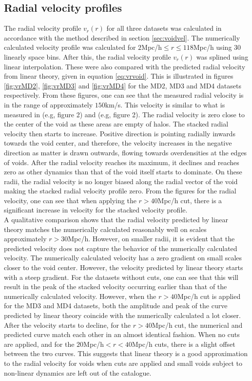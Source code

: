 \subsection{Radial velocity profiles}
The radial velocity profile $v_r(r)$ for all three datasets was calculated in accordance with the method described in section \ref{sec:voidvel}. The numerically calculated velocity profile was calculated for $2$Mpc/h$\leq r\leq 118$Mpc/h using $30$ linearly space bins. After this, the radial velocity profile $v_r(r)$ was splined using linear interpolation. These were also compared with the predicted radial velocity from linear theory, given in equation \ref{eq:vrvoid}. This is illustrated in figures \ref{fig:vrMD2}, \ref{fig:vrMD3} and \ref{fig:vrMD4} for the MD2, MD3 and MD4 datasets respectively. From these figures, one can see that the measured radial velocity is in the range of approximately $150$km/s. This velocity is similar to what is measured in \cite{Nadathur_2018} (e.g, figure 2) and \cite{Achitouv_streaming} (e.g, figure 2). The radial velocity is zero close to the center of the void as these areas are empty of halos. The stacked radial velocity then starts to increase. Positive direction is pointing radially inwards towards the void center, and therefore, the velocity increases in the negative direction as matter is drawn outwards, flowing towards overdensities at the edges of voids. After the radial velocity reaches its maximum, it declines and reaches zero as other dynamics than that of the void itself starts to dominate. On these radii, the radial velocity is no longer biased along the radial vector of the void making the stacked radial velocity profile zero. From the figures for the radial velocity, one can see that when applying the $r>40$Mpc/h cut, there is a significant increase in velocity for the stacked velocity profile. \\\indent
A qualitative comparison shows that the radial velocity predicted by linear theory matches the numerically calculated reasonably well on scales approximately $r>30$Mpc/h. However, on smaller radii, it is evident that the predicted velocity does not capture the behavior of the numerically calculated velocity. The numerically calculated velocity has a zero gradient on small scales closer to the void center. However, the velocity predicted by linear theory starts with a steep gradient. For the datasets without cuts, one can see that this will result in the peak of the stacked velocity occurring earlier than that of the numerically calculated velocity. However, when the $r>40$Mpc/h cut is applied for the MD3 and MD4 datasets, both the amplitude and peak of the curve predicted by linear theory coincide with the numerically calculated a lot closer. After the velocity starts to decline, for the $r>40$Mpc/h cut, the numerical and predicted curve match each other in an almost identical fashion. When no cuts are applied, and for the $20$Mpc/h$<r<40$Mpc/h cuts, there is a slight offset between the two curves. This suggests that linear theory is a good approximation to the radial velocity for voids when cuts are applied and small voids subject to non-linear dynamics are left out of the catalogue.\\\indent
